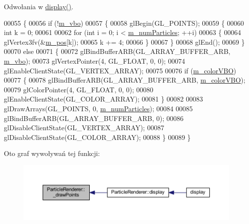 Odwołania w \hyperlink{render__particles_8cpp_source_l00091}{display()}.


\begin{DoxyCode}
00055 \{
00056     \textcolor{keywordflow}{if} (!\hyperlink{class_particle_renderer_a7549feaa0982abbc44c9fe73f2eb251f}{m\_vbo})
00057     \{
00058         glBegin(GL\_POINTS);
00059         \{
00060             \textcolor{keywordtype}{int} k = 0;
00061 
00062             \textcolor{keywordflow}{for} (\textcolor{keywordtype}{int} i = 0; i < \hyperlink{class_particle_renderer_af885fdb5e6da925209dfd960f66b5fd8}{m\_numParticles}; ++i)
00063             \{
00064                 glVertex3fv(&\hyperlink{class_particle_renderer_a1d74720edb5c3a13edcdd176ac0d84c7}{m\_pos}[k]);
00065                 k += 4;
00066             \}
00067         \}
00068         glEnd();
00069     \}
00070     \textcolor{keywordflow}{else}
00071     \{
00072         glBindBufferARB(GL\_ARRAY\_BUFFER\_ARB, \hyperlink{class_particle_renderer_a7549feaa0982abbc44c9fe73f2eb251f}{m\_vbo});
00073         glVertexPointer(4, GL\_FLOAT, 0, 0);
00074         glEnableClientState(GL\_VERTEX\_ARRAY);
00075 
00076         \textcolor{keywordflow}{if} (\hyperlink{class_particle_renderer_a7dcaa73a41c598207974432206b423b5}{m\_colorVBO})
00077         \{
00078             glBindBufferARB(GL\_ARRAY\_BUFFER\_ARB, \hyperlink{class_particle_renderer_a7dcaa73a41c598207974432206b423b5}{m\_colorVBO});
00079             glColorPointer(4, GL\_FLOAT, 0, 0);
00080             glEnableClientState(GL\_COLOR\_ARRAY);
00081         \}
00082 
00083         glDrawArrays(GL\_POINTS, 0, \hyperlink{class_particle_renderer_af885fdb5e6da925209dfd960f66b5fd8}{m\_numParticles});
00084 
00085         glBindBufferARB(GL\_ARRAY\_BUFFER\_ARB, 0);
00086         glDisableClientState(GL\_VERTEX\_ARRAY);
00087         glDisableClientState(GL\_COLOR\_ARRAY);
00088     \}
00089 \}
\end{DoxyCode}


Oto graf wywoływań tej funkcji\-:\nopagebreak
\begin{figure}[H]
\begin{center}
\leavevmode
\includegraphics[width=350pt]{class_particle_renderer_a2683c43c010bff7973a977c1953f2bd6_icgraph}
\end{center}
\end{figure}


